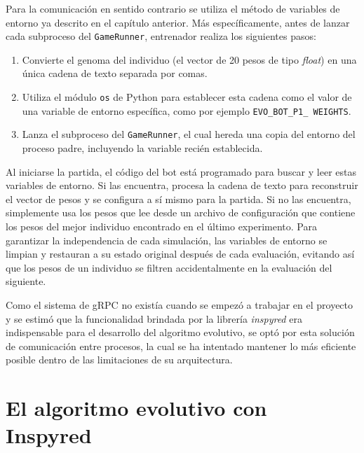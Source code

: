 Para la comunicación en sentido contrario se utiliza el método de variables de entorno ya descrito en el capítulo anterior. Más específicamente, antes de lanzar cada subproceso del \texttt{GameRunner}, entrenador realiza los siguientes pasos:
\begin{enumerate}
	\item Convierte el genoma del individuo (el vector de 20 pesos de tipo \textit{float}) en una única cadena de texto separada por comas.
	\item Utiliza el módulo \texttt{os} de Python para establecer esta cadena como el valor de una variable de entorno específica, como por ejemplo \texttt{EVO\_BOT\_P1\_ WEIGHTS}.
	\item Lanza el subproceso del \texttt{GameRunner}, el cual hereda una copia del entorno del proceso padre, incluyendo la variable recién establecida.
\end{enumerate}

Al iniciarse la partida, el código del bot está programado para buscar y leer estas variables de entorno. Si las encuentra, procesa la cadena de texto para reconstruir el vector de pesos y se configura a sí mismo para la partida. Si no las encuentra, simplemente usa los pesos que lee desde un archivo de configuración que contiene los pesos del mejor individuo encontrado en el último experimento. Para garantizar la independencia de cada simulación, las variables de entorno se limpian y restauran a su estado original después de cada evaluación, evitando así que los pesos de un individuo se filtren accidentalmente en la evaluación del siguiente.

Como el sistema de gRPC no existía cuando se empezó a trabajar en el proyecto y se estimó que la funcionalidad brindada por la librería \textit{inspyred} era indispensable para el desarrollo del algoritmo evolutivo, se optó por esta solución de comunicación entre procesos, la cual se ha intentado mantener lo más eficiente posible dentro de las limitaciones de su arquitectura.


\section{El algoritmo evolutivo con Inspyred} \label{sec:algoritmo_evolutivo_inspyred}

